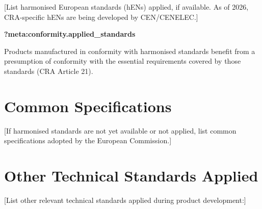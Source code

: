 \documentclass[
  11 pt,
  a4paper,
  table]{report}
\begin{document}
{[}List harmonised European standards (hENs) applied, if available. As
of 2026, CRA-specific hENs are being developed by CEN/CENELEC.{]}

\textbf{?meta:conformity.applied\_standards}

\begin{tcolorbox}[enhanced jigsaw, coltitle=black, bottomrule=.15mm, colback=white, leftrule=.75mm, opacitybacktitle=0.6, rightrule=.15mm, opacityback=0, arc=.35mm, toprule=.15mm, colframe=quarto-callout-note-color-frame, breakable, left=2mm, colbacktitle=quarto-callout-note-color!10!white, titlerule=0mm, bottomtitle=1mm, toptitle=1mm, title=\textcolor{quarto-callout-note-color}{\faInfo}\hspace{0.5em}{Presumption of Conformity}]

Products manufactured in conformity with harmonised standards benefit
from a presumption of conformity with the essential requirements covered
by those standards (CRA Article 21).

\end{tcolorbox}

\section{Common Specifications}\label{common-specifications}

{[}If harmonised standards are not yet available or not applied, list
common specifications adopted by the European Commission.{]}

\section{Other Technical Standards
Applied}\label{other-technical-standards-applied}

{[}List other relevant technical standards applied during product
development:{]}
\end{document}
